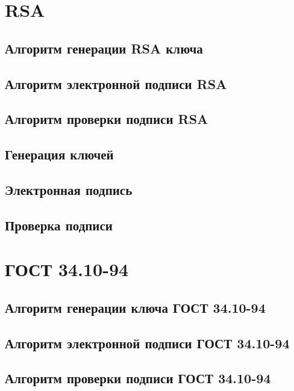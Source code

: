 \documentclass{article}
\begin{document}
\section{RSA}
\subsection{Алгоритм генерации RSA ключа}
\subsection{Алгоритм электронной подписи RSA}
\subsection{Алгоритм проверки подписи RSA}
\subsection{Генерация ключей}
\subsection{Электронная подпись}
\subsection{Проверка подписи}

\section{ГОСТ 34.10-94}
\subsection{Алгоритм генерации ключа ГОСТ 34.10-94}
\subsection{Алгоритм электронной подписи ГОСТ 34.10-94}
\subsection{Алгоритм проверки подписи ГОСТ 34.10-94}
\end{document}
